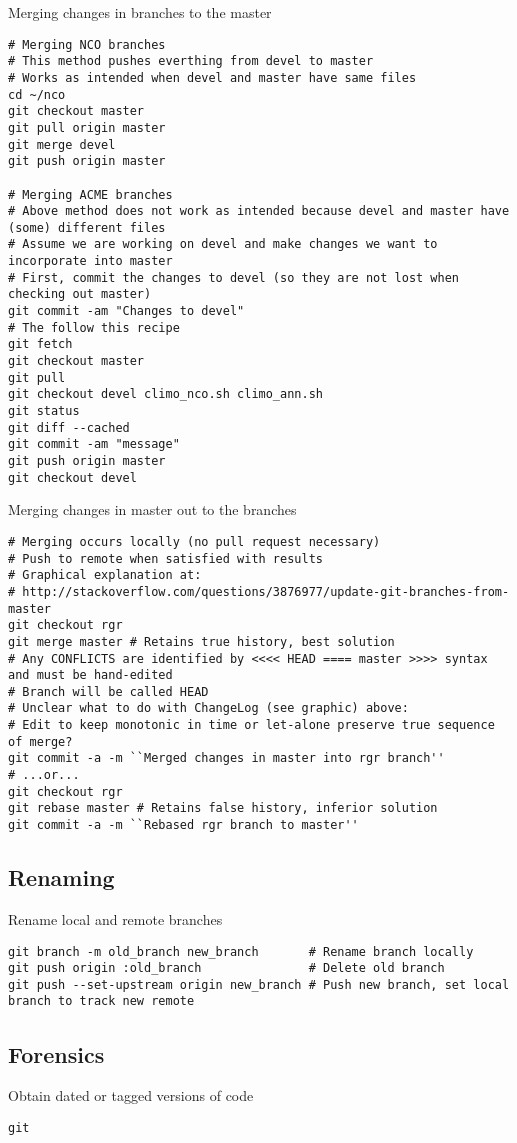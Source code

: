 \documentclass[12pt,twoside]{article}
\begin{document}
Merging changes in branches to the master
\begin{verbatim}
# Merging NCO branches
# This method pushes everthing from devel to master
# Works as intended when devel and master have same files
cd ~/nco
git checkout master
git pull origin master
git merge devel
git push origin master

# Merging ACME branches
# Above method does not work as intended because devel and master have (some) different files
# Assume we are working on devel and make changes we want to incorporate into master
# First, commit the changes to devel (so they are not lost when checking out master)
git commit -am "Changes to devel"
# The follow this recipe
git fetch
git checkout master
git pull
git checkout devel climo_nco.sh climo_ann.sh
git status
git diff --cached
git commit -am "message"
git push origin master
git checkout devel
\end{verbatim}

Merging changes in master out to the branches
\begin{verbatim}
# Merging occurs locally (no pull request necessary)
# Push to remote when satisfied with results
# Graphical explanation at:
# http://stackoverflow.com/questions/3876977/update-git-branches-from-master
git checkout rgr
git merge master # Retains true history, best solution
# Any CONFLICTS are identified by <<<< HEAD ==== master >>>> syntax and must be hand-edited
# Branch will be called HEAD
# Unclear what to do with ChangeLog (see graphic) above:
# Edit to keep monotonic in time or let-alone preserve true sequence of merge?
git commit -a -m ``Merged changes in master into rgr branch''
# ...or...
git checkout rgr
git rebase master # Retains false history, inferior solution
git commit -a -m ``Rebased rgr branch to master''
\end{verbatim}

\subsection{Renaming}\label{sxn:git_rnm}

Rename local and remote branches
\begin{verbatim}
git branch -m old_branch new_branch       # Rename branch locally    
git push origin :old_branch               # Delete old branch
git push --set-upstream origin new_branch # Push new branch, set local branch to track new remote
\end{verbatim}

\subsection{Forensics}\label{sxn:git_rnm}

Obtain dated or tagged versions of code
\begin{verbatim}
git 
\end{verbatim}

%
%
\end{document}
